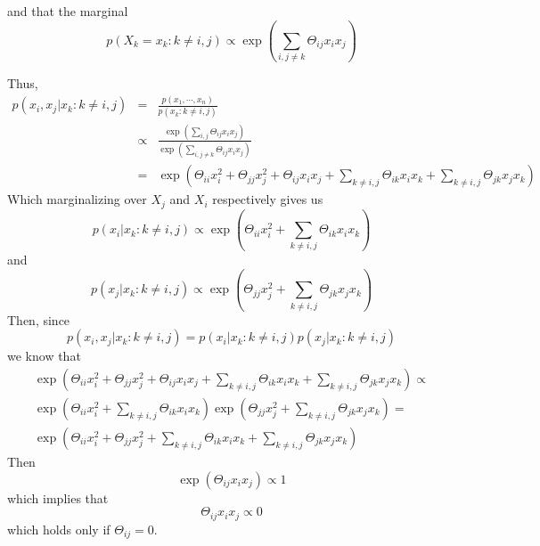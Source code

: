 \documentclass{article}
\begin{document}
\begin{enumerate}
\begin{enumerate}
		and that the marginal
		\begin{equation}
			p(X_k = x_k: k \not= i,j) \propto \exp(\sum_{i,j \not = k}\Theta_{ij}x_ix_j)
		\end{equation}

		Thus, 
		\begin{equation}
		\begin{aligned}
		p(x_i, x_j |x_k : k \not= i,j) & = & \frac{p(x_1,\cdots,x_n)}{p(x_k: k \not= i,j)} \\
		& \propto & \frac{\exp(\sum_{i,j}\Theta_{ij}x_ix_j)}{\exp(\sum_{i,j \not = k}\Theta_{ij}x_ix_j)}  \\
		& = & \exp(\Theta_{ii}x_i^2 + \Theta_{jj}x_j^2 + \Theta_{ij}x_ix_j + \sum_{k\not=i,j}\Theta_{ik}x_ix_k + \sum_{k\not=i,j}\Theta_{jk}x_jx_k)
		\end{aligned}
		\end{equation}
		Which marginalizing over $X_j$ and $X_i$ respectively gives us
		\begin{equation}
		p(x_i |x_k : k \not= i,j) \propto \exp(\Theta_{ii}x_i^2 + \sum_{k\not=i,j}\Theta_{ik}x_ix_k)
		\end{equation}
		and 
		\begin{equation}
		p(x_j |x_k : k \not= i,j) \propto \exp(\Theta_{jj}x_j^2 + \sum_{k\not=i,j}\Theta_{jk}x_jx_k)
		\end{equation}
		Then,
		since
		\begin{equation}
			p(x_i, x_j |x_k : k \not= i,j) = p(x_i|x_k : k \not= i,j)p(x_j|x_k : k \not= i,j)
		\end{equation}
		we know that
		\begin{equation}
		\begin{split}
		\exp(\Theta_{ii}x_i^2 + \Theta_{jj}x_j^2 + \Theta_{ij}x_ix_j + \sum_{k\not=i,j}\Theta_{ik}x_ix_k + \sum_{k\not=i,j}\Theta_{jk}x_jx_k)\propto \\ 
		\exp(\Theta_{ii}x_i^2 + \sum_{k\not=i,j}\Theta_{ik}x_ix_k)\exp(\Theta_{jj}x_j^2 + \sum_{k\not=i,j}\Theta_{jk}x_jx_k) = \\
		\exp(\Theta_{ii}x_i^2 + \Theta_{jj}x_j^2 + \sum_{k\not=i,j}\Theta_{ik}x_ix_k + \sum_{k\not=i,j}\Theta_{jk}x_jx_k)
		\end{split}
		\end{equation}
		Then
		\begin{equation}
		\exp(\Theta_{ij}x_ix_j) \propto 1
		\end{equation}
		which implies that 
		\begin{equation}
		\Theta_{ij}x_ix_j \propto 0
		\end{equation}
		which holds only if $\Theta_{ij} = 0$. 


\end{enumerate}
\end{enumerate}
\end{document}
